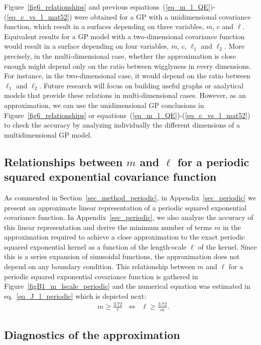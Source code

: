 Figure~\ref{fig6_relationships} and previous equations~(\ref{eq_m_l_QE})-(\ref{eq_c_vs_l_mat52}) were obtained for a GP with a unidimensional covariance function, which result in a surfaces depending on three variables, $m$, $c$ and $\ell$. Equivalent results for a GP model with a two-dimensional covariance function would result in a surface depending on four variables, $m$, $c$, $\ell_1$ and $\ell_2$. More precisely, in the multi-dimensional case, whether the approximation is close enough might depend only on the ratio between wigglyness in every dimensions. For instance, in the two-dimensional case, it would depend on the ratio between $\ell_1$ and $\ell_2$. Future research will focus on building useful graphs or analytical models that provide these relations in multi-dimensional cases. However, as an approximation, we can use the unidimensional GP conclusions in Figure~\ref{fig6_relationships} or equations~(\ref{eq_m_l_QE})-(\ref{eq_c_vs_l_mat52}) to check the accuracy by analyzing individually the different dimensions of a multidimensional GP model.

\subsection{Relationships between $m$ and $\ell$ for a periodic squared exponential covariance function} \label{subsec_empiric_relations_periodic}

As commented in Section~\ref{sec_method_periodic}, in Appendix~\ref{sec_periodic} we present an approximate linear representation of a periodic squared exponential covariance function. In Appendix~\ref{sec_periodic}, we also analyze the accuracy of this linear representation and derive the minimum number of terms $m$ in the approximation required to achieve a close approximation to the exact periodic squared exponential kernel as a function of the length-scale $\ell$ of the kernel. Since this is a series expansion of sinusoidal functions, the approximation does not depend on any boundary condition. This relationship between $m$ and $\ell$ for a periodic squared exponential covariance function is gathered in Figure~\ref{figB1_m_lscale_periodic} and the numerical equation was estimated in eq.~\eqref{eq_J_l_periodic} which is depicted next:
%
\begin{align*}
&m \geq \frac{3.72}{\ell} \;\; \Leftrightarrow \;\; \ell \geq \frac{3.72}{m} .
\end{align*}

\subsection{Diagnostics of the approximation} \label{subsec_diagnostics}

